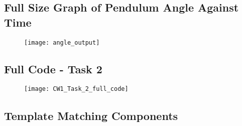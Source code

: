 \documentclass[conference]{IEEEtran}
\begin{document}
\begin{appendix}
\subsection{Full Size Graph of Pendulum Angle Against Time}

\begin{figure}[H]
\centerline{\texttt{[image: angle\_output]}}
\end{figure}

\label{appendix:angle_output_full_size}

\subsection{Full Code - Task 2 }

\begin{figure}[H]
\centerline{\texttt{[image: CW1\_Task\_2\_full\_code]}}
\end{figure}

\label{appendix:task_2_full_code}

\subsection{Template Matching Components}

\begin{figure}[H]
\centering
{}
\end{figure}

\label{appendix:template_matching_components}


\end{appendix}
\end{document}
